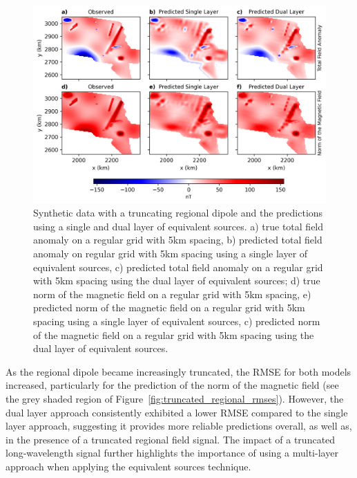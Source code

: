 \begin{figure}[!h]
\centering
\includegraphics[width=1\linewidth]{paper/figures/truncated_regional.png}
\caption{
    Synthetic data with a truncating regional dipole and the predictions using a single and dual layer of equivalent sources. a) true total field anomaly on a regular grid with 5km spacing, b) predicted total field anomaly on regular grid with 5km spacing using a single layer of equivalent sources, c) predicted total field anomaly on a regular grid with 5km spacing using the dual layer of equivalent sources; d) true norm of the magnetic field on a regular grid with 5km spacing, e) predicted norm of the magnetic field on a regular grid with 5km spacing using a single layer of equivalent sources, c) predicted norm of the magnetic field on a regular grid with 5km spacing using the dual layer of equivalent sources.
}
\label{fig:truncated_regional}
\end{figure}


As the regional dipole became increasingly truncated, the RMSE for both models increased, particularly for the prediction of the norm of the magnetic field (see the grey shaded region of Figure~\ref{fig:truncated_regional_rmses}). However, the dual layer approach consistently exhibited a lower RMSE compared to the single layer approach, suggesting it provides more reliable predictions overall, as well as, in the presence of a truncated regional field signal. The impact of a truncated long-wavelength signal further highlights the importance of using a multi-layer approach when applying the equivalent sources technique.

